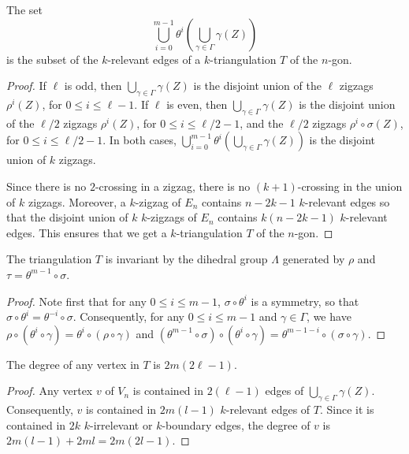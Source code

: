 \documentclass[12pt]{amsart}
\begin{document}
\begin{lemma}
The set
$$\bigcup_{i=0}^{m-1} \theta^i\left(\bigcup_{\gamma\in\Gamma} \gamma(Z)\right)$$
is the subset of the $k$-relevant edges of a $k$-triangulation $T$ of the $n$-gon.
\end{lemma}

\begin{proof}
If $\ell$ is odd, then $\bigcup_{\gamma\in\Gamma} \gamma(Z)$ is the disjoint union of the $\ell$ zigzags $\rho^i(Z)$, for $0\le i\le \ell-1$.
If $\ell$ is even, then $\bigcup_{\gamma\in\Gamma} \gamma(Z)$ is the disjoint union of the $\ell/2$ zigzags $\rho^i(Z)$, for $0\le i\le \ell/2-1$, and the $\ell/2$ zigzags $\rho^i\circ\sigma(Z)$, for $0\le i\le \ell/2-1$.
In both cases, $\bigcup_{i=0}^{m-1} \theta^i\left(\bigcup_{\gamma\in\Gamma} \gamma(Z)\right)$ is the disjoint union of $k$ zigzags.

Since there is no $2$-crossing in a zigzag, there is no $(k+1)$-crossing in the union of $k$ zigzags. Moreover, a $k$-zigzag of $E_n$ contains $n-2k-1$ $k$-relevant edges so that the disjoint union of $k$ $k$-zigzags of $E_n$ contains $k(n-2k-1)$ $k$-relevant edges. This ensures that we get a $k$-triangulation $T$ of the $n$-gon.
\end{proof}

\begin{lemma}\label{transformation}
The triangulation $T$ is invariant by the dihedral group $\Lambda$ generated by $\rho$ and $\tau=\theta^{m-1}\circ\sigma$.
\end{lemma}

\begin{proof}
Note first that for any $0\le i\le m-1$, $\sigma\circ\theta^i$ is a symmetry, so that $\sigma\circ\theta^i=\theta^{-i}\circ\sigma$.
Consequently, for any $0\le i\le m-1$ and $\gamma\in\Gamma$, we have
$\rho\circ(\theta^i\circ\gamma)=\theta^i\circ(\rho\circ\gamma)$ and $(\theta^{m-1}\circ\sigma)\circ(\theta^i\circ\gamma)=\theta^{m-1-i}\circ(\sigma\circ\gamma)$.
\end{proof}

\begin{lemma}
The degree of any vertex in $T$ is $2m(2\ell-1)$.
\end{lemma}

\begin{proof}
Any vertex $v$ of $V_n$ is contained in $2(\ell-1)$ edges of $\bigcup_{\gamma\in\Gamma} \gamma(Z)$. Consequently, $v$ is contained in $2m(l-1)$ $k$-relevant edges of $T$. Since it is contained in $2k$ $k$-irrelevant or $k$-boundary edges, the degree of $v$ is $2m(l-1)+2ml=2m(2l-1)$.
\end{proof}
\end{document}
